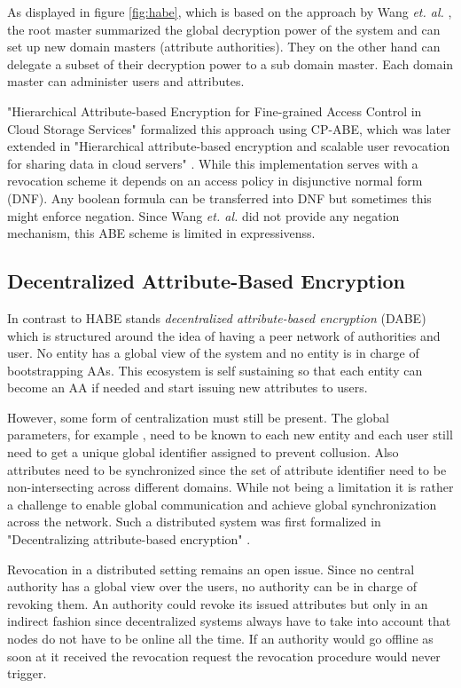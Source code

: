 As displayed in figure \ref{fig:habe}, which is based on the approach by Wang \textit{et. al.} \cite{wang2011hierarchical}, the root master summarized the global decryption power of the system and can set up new domain masters (attribute authorities). They on the other hand can delegate a subset of their decryption power to a sub domain master. Each domain master can administer users and attributes.

"Hierarchical Attribute-based Encryption for Fine-grained Access Control in Cloud Storage Services" \cite{Wang:2010:HAE:1866307.1866414} formalized this approach using \ac{CP-ABE}, which was later extended in "Hierarchical attribute-based encryption and scalable user revocation for sharing data in cloud servers" \cite{wang2011hierarchical}. While this implementation serves with a revocation scheme it depends on an access policy in disjunctive normal form (\ac{DNF}). Any boolean formula can be transferred into DNF but sometimes this might enforce negation. Since Wang \textit{et. al.} \cite{wang2011hierarchical} did not provide any negation mechanism, this ABE scheme is limited in expressivenss.

\subsection{Decentralized Attribute-Based Encryption}
\label{sec:DABE}
In contrast to HABE stands \textit{decentralized attribute-based encryption} (\ac{DABE}) which is structured around the idea of having a peer network of authorities and user. No entity has a global view of the system and no entity is in charge of bootstrapping AAs. This ecosystem is self sustaining so that each entity can become an \ac{AA} if needed and start issuing new attributes to users. 

However, some form of centralization must still be present. The global parameters, for example , need to be known to each new entity and each user still need to get a unique global identifier assigned to prevent collusion. Also attributes need to be synchronized since the set of attribute identifier need to be non-intersecting across different domains. While not being a limitation it is rather a challenge to enable global communication and achieve global synchronization across the network. Such a distributed system was first formalized in "Decentralizing attribute-based encryption" \cite{lewko2011decentralizing}. 

Revocation in a distributed setting remains an open issue. Since no central authority has a global view over the users, no authority can be in charge of revoking them. An authority could revoke its issued attributes but only in an indirect fashion since decentralized systems always have to take into account that nodes do not have to be online all the time. If an authority would go offline as soon at it received the revocation request the revocation procedure would never trigger. 

